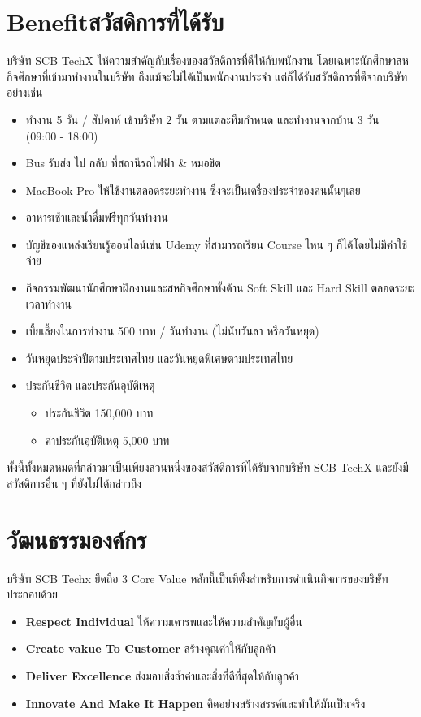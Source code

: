 \section{\ifenglish Benefit\else สวัสดิการที่ได้รับ\fi}
บริษัท SCB TechX ให้ความสำคัญกับเรื่องของสวัสดิการที่ดีให้กับพนักงาน โดยเฉพาะนักศึกษาสหกิจศึกษาที่เข้ามาทำงานในบริษัท
ถึงแม้จะไม่ได้เป็นพนักงานประจำ แต่ก็ได้รับสวัสดิการที่ดีจากบริษัทอย่างเช่น
\begin{itemize}
      \item ทำงาน 5 วัน / สัปดาห์ เข้าบริษัท 2 วัน ตามแต่ละทีมกำหนด และทำงานจากบ้าน 3 วัน \\(09:00 - 18:00)
      \item Bus รับส่ง ไป กลับ ที่สถานีรถไฟฟ้า \& หมอชิต
      \item MacBook Pro ให้ใช้งานตลอดระยะทำงาน ซึ่งจะเป็นเครื่องประจำของคนนั้นๆเลย
      \item อาหารเช้าและน้ำดื่มฟรีทุกวันทำงาน
      \item บัญชีของแหล่งเรียนรู้ออนไลน์เช่น Udemy ที่สามารถเรียน Course ไหน ๆ ก็ได้โดยไม่มีค่าใช้จ่าย
      \item กิจกรรมพัฒนานักศึกษาฝึกงานและสหกิจศึกษาทั้งด้าน Soft Skill และ Hard Skill ตลอดระยะเวลาทำงาน
      \item เบี้ยเลี้ยงในการทำงาน 500 บาท / วันทำงาน (ไม่นับวันลา หรือวันหยุด)
      \item วันหยุดประจำปีตามประเทศไทย และวันหยุดพิเศษตามประเทศไทย
      \item ประกันชีวิต และประกันอุบัติเหตุ
            \begin{itemize}
                  \item ประกันชีวิต 150,000 บาท
                  \item ค่าประกันอุบัติเหตุ 5,000 บาท
            \end{itemize}
\end{itemize}
ทั้งนี้ทั้งหมดหมดที่กล่าวมาเป็นเพียงส่วนหนึ่งของสวัสดิการที่ได้รับจากบริษัท SCB TechX และยังมีสวัสดิการอื่น ๆ ที่ยังไม่ได้กล่าวถึง

\section{วัฒนธรรมองค์กร}
บริษัท SCB Techx ยึดถือ 3 Core Value หลักนี้เป็นที่ตั้งสำหรับการดำเนินกิจการของบริษัทประกอบด้วย
\begin{itemize}
      \item \textbf{Respect Individual} ให้ความเคารพและให้ความสำคัญกับผู้อื่น
      \item \textbf{Create vakue To Customer} สร้างคุณค่าให้กับลูกค้า
      \item \textbf{Deliver Excellence} ส่งมอบสิ่งล้ำค่าและสิ่งที่ดีที่สุดให้กับลูกค้า
      \item \textbf{Innovate And Make It Happen} คิดอย่างสร้างสรรค์และทำให้มันเป็นจริง
\end{itemize}

